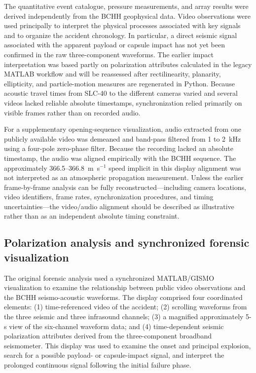 \documentclass[]{seismica}
\begin{document}
The quantitative event catalogue, pressure measurements, and array results were
derived independently from the BCHH geophysical data. Video observations were
used principally to interpret the physical processes associated with key
signals and to organize the accident chronology. In particular, a direct
seismic signal associated with the apparent payload or capsule impact has not
yet been confirmed in the raw three-component waveforms. The earlier impact
interpretation was based partly on polarization attributes calculated in the
legacy MATLAB workflow and will be reassessed after rectilinearity, planarity,
ellipticity, and particle-motion measures are regenerated in Python. Because
acoustic travel times from SLC-40 to the different cameras varied and several
videos lacked reliable absolute timestamps, synchronization relied primarily
on visible frames rather than on recorded audio.

For a supplementary opening-sequence visualization, audio extracted from one publicly available video was demeaned and band-pass filtered from 1 to 2~kHz using a four-pole zero-phase filter. Because the recording lacked an absolute timestamp, the audio was aligned empirically with the BCHH sequence. The approximately 366.5--366.8~m~s$^{-1}$ speed implicit in this display alignment was not interpreted as an atmospheric propagation measurement. Unless the earlier frame-by-frame analysis can be fully reconstructed---including camera locations, video identifiers, frame rates, synchronization procedures, and timing uncertainties---the video/audio alignment should be described as illustrative rather than as an independent absolute timing constraint.

\subsection{Polarization analysis and synchronized forensic visualization}
\label{sec:methods_polarization}

The original forensic analysis used a synchronized MATLAB/GISMO visualization
to examine the relationship between public video observations and the BCHH
seismo-acoustic waveforms. The display comprised four coordinated elements:
(1) time-referenced video of the accident; (2) scrolling waveforms from the
three seismic and three infrasound channels; (3) a magnified approximately
5-s view of the six-channel waveform data; and (4) time-dependent seismic
polarization attributes derived from the three-component broadband
seismometer. This display was used to examine the onset and principal
explosion, search for a possible payload- or capsule-impact signal, and
interpret the prolonged continuous signal following the initial failure phase.
\end{document}
